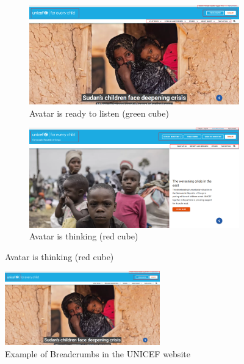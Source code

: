 \begin{figure}[h]
    \centering
	\begin{subfigure}[b]{0.40\textwidth}
        \centering
        \includegraphics[width=\textwidth]{img/critical_heuristics/N4.1a.png}
        \caption{Avatar is ready to listen (green cube)}
        \label{fig:greenlight}
    \end{subfigure}
    \hfill
    \begin{subfigure}[b]{0.40\textwidth}
        \centering
        \includegraphics[width=\textwidth]{img/critical_heuristics/N4.1b.png}
        \caption{Avatar is thinking (red cube)}
        \label{fig:redlight}
    \end{subfigure}
\end{figure}

\begin{figure}[h]
	\centering
	\includegraphics[width=0.6\textwidth]{img/critical_heuristics/N7.1 N7.2.png}
	\caption{Example of Breadcrumbs in the UNICEF website}
	\label{fig:N7.1}
\end{figure}

